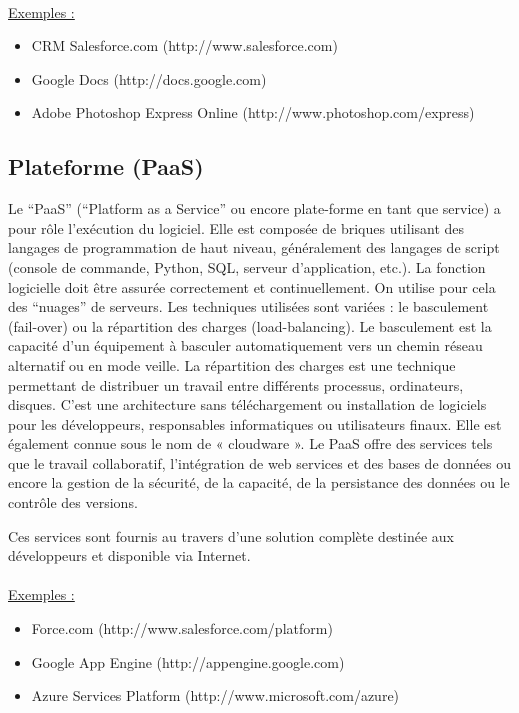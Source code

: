 \documentclass[a4paper,12pt]{report}
\begin{document}
\begin{onehalfspace}
	\paragraph*{}
	\underline{Exemples :}
	\begin{itemize}
		\item CRM Salesforce.com (http://www.salesforce.com)
		\item Google Docs (http://docs.google.com)
		\item Adobe Photoshop Express Online (http://www.photoshop.com/express)
	\end{itemize}

	\subsection{Plateforme (PaaS)}
	Le “PaaS” (“Platform as a Service” ou encore plate-forme en tant que service) a pour rôle l’exécution du logiciel. Elle est composée de briques utilisant des langages de programmation de haut niveau, généralement des langages de script (console de commande, Python, SQL, serveur d'application, etc.). La fonction logicielle doit être assurée correctement et continuellement. On utilise pour cela des “nuages” de serveurs. Les techniques utilisées sont variées : le basculement (fail-over) ou la répartition des charges (load-balancing). Le basculement est la capacité d’un équipement à basculer automatiquement vers un chemin réseau alternatif ou en mode veille. La répartition des charges est une technique permettant de distribuer un travail entre différents processus, ordinateurs, disques. C'est une architecture sans téléchargement ou installation de logiciels pour les développeurs, responsables informatiques ou utilisateurs finaux. Elle est également connue sous le nom de « cloudware ». Le PaaS offre des services tels que le travail collaboratif, l’intégration de web services et des bases de données ou encore la gestion de la sécurité, de la capacité, de la persistance des données ou le contrôle des versions.
	
	Ces services sont fournis au travers d’une solution complète destinée aux développeurs et disponible via Internet.
	
	\paragraph*{}
	\underline{Exemples :}
	\begin{itemize}
		\item Force.com (http://www.salesforce.com/platform)
		\item Google App Engine (http://appengine.google.com)
		\item Azure Services Platform (http://www.microsoft.com/azure)
	\end{itemize}
	

\end{onehalfspace}
\end{document}
